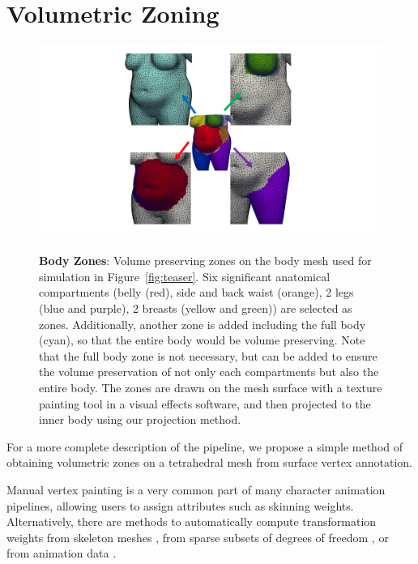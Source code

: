 \chapter{Volumetric Zoning}
\label{ch:Volumetric Zoning}

\begin{figure}[h] \centering
	{\includegraphics[width=6.0in]{images/body_xl/zones.pdf}}
	\caption{\textbf{Body Zones}: Volume preserving zones on the body mesh used for simulation in
		Figure~\ref{fig:teaser}. Six significant anatomical compartments (belly (red), side and back waist (orange), 2 legs (blue and purple), 2 breasts (yellow and green)) are selected as zones. Additionally, another zone is added including the full body (cyan), so that the entire body would be volume preserving. Note that the full body zone is not necessary, but can be added to ensure the volume preservation of not only each compartments but also the entire body. The zones are drawn on the mesh surface with a texture painting tool in a visual effects software, and then projected to the inner body using our projection method. }
	\label{fig:body_zones}
\end{figure}

For a more complete description of the pipeline, we propose a simple method of obtaining
volumetric zones on a tetrahedral mesh from surface vertex annotation.

Manual vertex painting is a very common part of
many character animation pipelines, allowing users to assign attributes such as skinning weights.
Alternatively, there are methods to automatically compute transformation weights from
skeleton meshes \cite{Rohmer:2009, Baran:2007, Weber:2007}, from sparse subsets of degrees of freedom
\cite{Jacobson:2012}, or from animation data \cite{James:2005}. 

